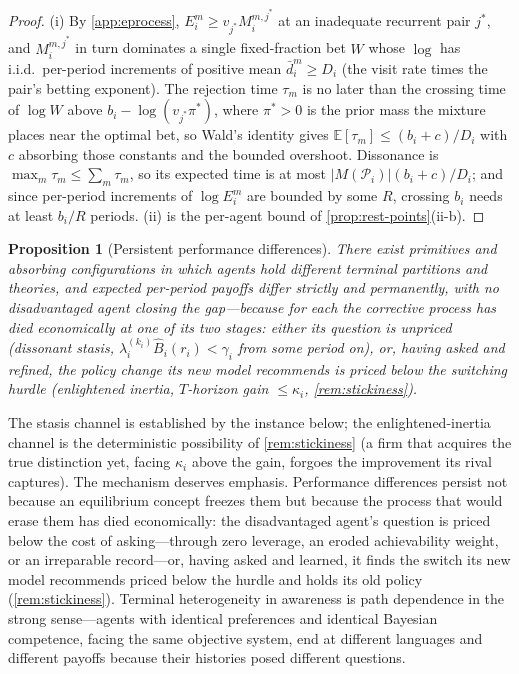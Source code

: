 \documentclass[11pt]{article}
\newtheorem{proposition}[assumption]{Proposition}
\theoremstyle{definition}
\begin{document}
\begin{proof}
(i) By \cref{app:eprocess}, $E_i^{m}\ge v_{j^{*}}M_i^{m,j^{*}}$ at an inadequate recurrent pair $j^{*}$, and $M_i^{m,j^{*}}$ in turn dominates a single fixed-fraction bet $W$ whose $\log$ has i.i.d.\ per-period increments of positive mean $\bar d_i^{m}\ge D_i$ (the visit rate times the pair's betting exponent). The rejection time $\tau_m$ is no later than the crossing time of $\log W$ above $b_i-\log(v_{j^{*}}\pi^{*})$, where $\pi^{*}>0$ is the prior mass the mixture places near the optimal bet, so Wald's identity gives $\mathbb E[\tau_m]\le(b_i+c)/D_i$ with $c$ absorbing those constants and the bounded overshoot. Dissonance is $\max_m\tau_m\le\sum_m\tau_m$, so its expected time is at most $\lvert M(\mathcal P_i)\rvert(b_i+c)/D_i$; and since per-period increments of $\log E_i^{m}$ are bounded by some $R$, crossing $b_i$ needs at least $b_i/R$ periods. (ii) is the per-agent bound of \cref{prop:rest-points}(ii-b).
\end{proof}

\begin{proposition}[Persistent performance differences]
\label{prop:persistence}
There exist primitives and absorbing configurations in which agents hold different terminal partitions and theories, and expected per-period payoffs differ strictly and permanently, with no disadvantaged agent closing the gap---because for each the corrective process has died economically at one of its two stages: either its question is unpriced (\emph{dissonant stasis}, $\lambda_i^{(k_i)}\widehat B_i(r_i)<\gamma_i$ from some period on), or, having asked and refined, the policy change its new model recommends is priced below the switching hurdle (\emph{enlightened inertia}, $T$-horizon gain $\le\kappa_i$, \cref{rem:stickiness}).
\end{proposition}

The stasis channel is established by the instance below; the enlightened-inertia channel is the deterministic possibility of \cref{rem:stickiness} (a firm that acquires the true distinction yet, facing $\kappa_i$ above the gain, forgoes the improvement its rival captures). The mechanism deserves emphasis.
Performance differences persist not because an equilibrium concept freezes them but because the process that would erase them has died economically: the disadvantaged agent's question is priced below the cost of asking---through zero leverage, an eroded achievability weight, or an irreparable record---or, having asked and learned, it finds the switch its new model recommends priced below the hurdle and holds its old policy (\cref{rem:stickiness}).
Terminal heterogeneity in awareness is path dependence in the strong sense---agents with identical preferences and identical Bayesian competence, facing the same objective system, end at different languages and different payoffs because their histories posed different questions.
\end{document}
